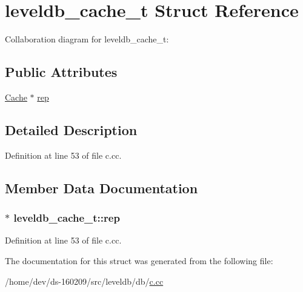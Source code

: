 \hypertarget{structleveldb__cache__t}{}\section{leveldb\+\_\+cache\+\_\+t Struct Reference}
\label{structleveldb__cache__t}


Collaboration diagram for leveldb\+\_\+cache\+\_\+t\+:
\subsection*{Public Attributes}
\begin{DoxyCompactItemize}
\item 
\hyperlink{classleveldb_1_1_cache}{Cache} $\ast$ \hyperlink{structleveldb__cache__t_a78f74e9a86ea86296e562fe990751a4a}{rep}
\end{DoxyCompactItemize}


\subsection{Detailed Description}


Definition at line 53 of file c.\+cc.



\subsection{Member Data Documentation}
\hypertarget{structleveldb__cache__t_a78f74e9a86ea86296e562fe990751a4a}{}
\subsubsection[{rep}]{$\ast$ leveldb\+\_\+cache\+\_\+t\+::rep}\label{structleveldb__cache__t_a78f74e9a86ea86296e562fe990751a4a}


Definition at line 53 of file c.\+cc.



The documentation for this struct was generated from the following file\+:\begin{DoxyCompactItemize}
\item 
/home/dev/ds-\/160209/src/leveldb/db/\hyperlink{c_8cc}{c.\+cc}\end{DoxyCompactItemize}
